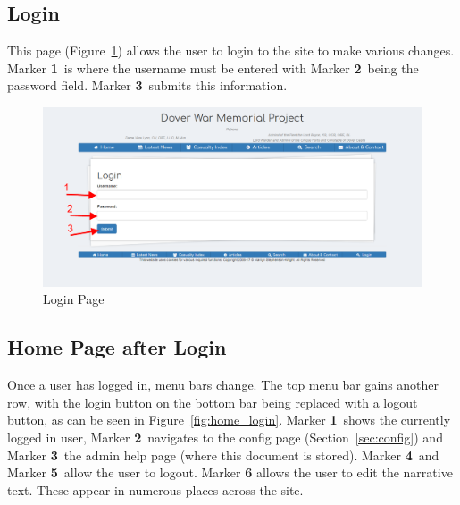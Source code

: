 \documentclass[12pt]{article}
\newcommand{\marker}[1]{Marker \color{red}\textbf{#1}\color{black}}
\begin{document}
\newpage
\FloatBarrier
\subsection{Login}\label{ssec:login}
This page (Figure~\ref{fig:login}) allows the user to login to the site to make various changes. \marker{1}\ is where the username must be entered with \marker{2}\ being the password field. \marker{3}\ submits this information.

\begin{figure}[h]
  \centering
 \includegraphics[width=\textwidth]{pics/login.png}
	\caption{Login Page}\label{fig:login}
\end{figure}

\newpage
\FloatBarrier
\subsection{Home Page after Login}
Once a user has logged in, menu bars change. The top menu bar gains another row, with the login button on the bottom bar being replaced with a logout button, as can be seen in Figure~\ref{fig:home_login}. \marker{1}\ shows the currently logged in user, \marker{2}\ navigates to the config page (Section~\ref{sec:config}) and \marker{3}\ the admin help page (where this document is stored). \marker{4}\ and \marker{5}\ allow the user to logout. \marker{6} allows the user to edit the narrative text. These appear in numerous places across the site.
\end{document}
